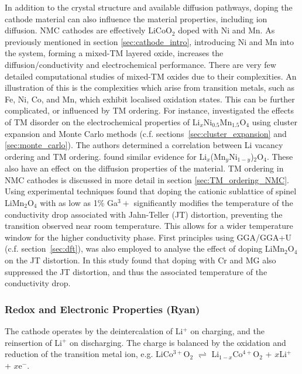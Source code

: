 \documentclass[../main.tex]{subfiles}
\begin{document}
In addition to the crystal structure and available diffusion pathways, doping the cathode material can also influence the material properties, including ion diffusion. NMC cathodes are effectively LiCoO$_2$ doped with Ni and Mn. As previously mentioned in section \ref{sec:cathode_intro}, introducing Ni and Mn into the system, forming a mixed-TM layered oxide, increases the diffusion/conductivity and electrochemical performance. There are very few detailed computational studies of mixed-TM oxides due to their complexities. An illustration of this is the complexities which arise from transition metals, such as Fe, Ni, Co, and Mn, which exhibit localised oxidation states. This can be further complicated, or influenced by TM ordering. For instance, \citeauthor{lee2013solid} investigated the effects of TM disorder on the electrochemical properties of Li$_x$Ni$_{0.5}$Mn$_{1.5}$O$_4$ using cluster expansion and Monte Carlo methods (c.f. sections~\ref{sec:cluster_expansion} and \ref{sec:monte_carlo}). The authors determined a correlation between Li vacancy ordering and TM ordering. \cite{lee2013solid} \citeauthor{hao2016quaternary} found similar evidence for Li$_x$(Mn$_y$Ni$_{1-y}$)$_2$O$_4$. \cite{hao2016quaternary} These also have an effect on the diffusion properties of the material. TM ordering in NMC cathodes is discussed in more detail in section \ref{sec:TM_ordering_NMC}. Using experimental techniques \citeauthor{capsoni2002inhibition} found that doping the cationic sublattice of spinel LiMn$_2$O$_4$ with as low as 1\% Ga${^3+}$ significantly modifies the temperature of the conductivity drop associated with Jahn-Teller (JT) distortion, preventing the transition observed near room temperature. \cite{capsoni2002inhibition} This allows for a wider temperature window for the higher conductivity phase. First principles using GGA/GGA+U (c.f. section~\ref{sec:dft}), was also employed to analyse the effect of doping LiMn$_2$O$_4$ on the JT distortion. In this study \citeauthor{singh2009suppression} found that doping with Cr and MG also suppressed the JT distortion, and thus the associated temperature of the conductivity drop. \cite{singh2009suppression} 

\subsubsection{Redox and Electronic Properties (Ryan)}
The cathode operates by the deintercalation of Li$^+$ on charging, and the reinsertion of Li$^+$ on discharging. The charge is balanced by the oxidation and reduction of the transition metal ion, e.g. LiCo$^{3+}$O$_2$ $\rightleftharpoons$ Li$_{1-x}$Co$^{4+}$O$_2$ + $x$Li$^+$ + $x$e$^-$. 
\end{document}
